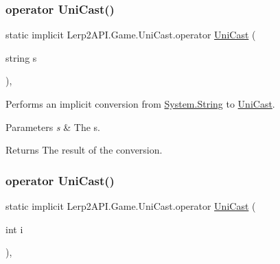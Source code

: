 \subsubsection{\texorpdfstring{operator Uni\+Cast()}{operator UniCast()}\hspace{0.1cm}{\footnotesize\ttfamily [1/4]}}
{\footnotesize\ttfamily static implicit Lerp2\+A\+P\+I.\+Game.\+Uni\+Cast.\+operator \hyperlink{class_lerp2_a_p_i_1_1_game_1_1_uni_cast}{Uni\+Cast} (\begin{DoxyParamCaption}\item[{string}]{s }\end{DoxyParamCaption})\hspace{0.3cm}{\ttfamily [inline]}, {\ttfamily [static]}}



Performs an implicit conversion from \hyperlink{namespace_lerp2_a_p_i_1_1_game_a2f182da062f210cc43f341f6992ee293a27118326006d3829667a400ad23d5d98}{System.\+String} to \hyperlink{class_lerp2_a_p_i_1_1_game_1_1_uni_cast}{Uni\+Cast}. 


\begin{DoxyParams}{Parameters}
{\em s} & The s.\\
\hline
\end{DoxyParams}
\begin{DoxyReturn}{Returns}
The result of the conversion.
\end{DoxyReturn}
\mbox{\label{class_lerp2_a_p_i_1_1_game_1_1_uni_cast_a922fc21d251c23204822693c8e61cdbe}} 
\subsubsection{\texorpdfstring{operator Uni\+Cast()}{operator UniCast()}\hspace{0.1cm}{\footnotesize\ttfamily [2/4]}}
{\footnotesize\ttfamily static implicit Lerp2\+A\+P\+I.\+Game.\+Uni\+Cast.\+operator \hyperlink{class_lerp2_a_p_i_1_1_game_1_1_uni_cast}{Uni\+Cast} (\begin{DoxyParamCaption}\item[{int}]{i }\end{DoxyParamCaption})\hspace{0.3cm}{\ttfamily [inline]}, {\ttfamily [static]}}



